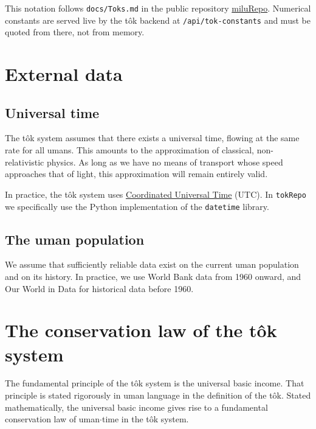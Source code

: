 \documentclass[letterpaper]{article}
\begin{document}
\vspace{8pt}
This notation follows \texttt{docs/Toks.md} in the public repository
\href{https://github.com/MaximeTousignant/miluRepo}{miluRepo}. Numerical constants are
served live by the t\^{o}k backend at \texttt{/api/tok-constants} and must be quoted from
there, not from memory.

\section{External data}

\subsection{Universal time}

The t\^{o}k system assumes that there exists a universal time, flowing at the same rate
for all umans. This amounts to the approximation of classical, non-relativistic physics.
As long as we have no means of transport whose speed approaches that of light, this
approximation will remain entirely valid.

In practice, the t\^{o}k system uses
\href{https://en.wikipedia.org/wiki/Coordinated_Universal_Time}{Coordinated Universal
Time} (UTC). In \texttt{tokRepo} we specifically use the Python implementation of the
\texttt{datetime} library.

\subsection{The uman population}

We assume that sufficiently reliable data exist on the current uman population and on its
history. In practice, we use World Bank data \cite{WorldBankPopulation} from 1960 onward,
and Our World in Data \cite{OwidPopulation} for historical data before 1960.

\section{The conservation law of the t\^{o}k system}

The fundamental principle of the t\^{o}k system is the universal basic income. That
principle is stated rigorously in uman language in the definition of the t\^{o}k. Stated
mathematically, the universal basic income gives rise to a fundamental conservation law
of uman$\cdot$time in the t\^{o}k system.
\end{document}
